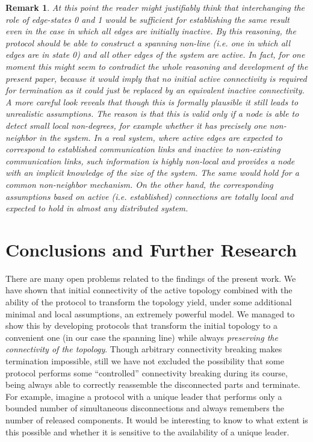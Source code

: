 \documentclass[preprint]{elsarticle}
\newtheorem{remark}{Remark}
\begin{document}
\begin{remark}
At this point the reader might justifiably think that interchanging the role of edge-states 0 and 1 would be sufficient for establishing the same result even in the case in which all edges are initially inactive. By this reasoning, the protocol should be able to construct a spanning \emph{non-line} (i.e. one in which all edges are in state 0) and all other edges of the system are active. In fact, for one moment this might seem to contradict the whole reasoning and development of the present paper, because it would imply that no initial active connectivity is required for termination as it could just be replaced by an equivalent inactive connectivity. A more careful look reveals that though this is formally plausible it still leads to unrealistic assumptions. The reason is that this is valid only if a node is able to detect small local \emph{non-degrees}, for example whether it has precisely one \emph{non-neighbor} in the system. In a real system, where active edges are expected to correspond to established communication links and inactive to non-existing communication links, such information is \emph{highly non-local} and provides a node with an \emph{implicit knowledge of the size of the system}. The same would hold for a common non-neighbor mechanism. On the other hand, the corresponding assumptions based on active (i.e. established) connections are totally local and expected to hold in almost any distributed system.
\end{remark}

\section{Conclusions and Further Research}
\label{sec:conclusions}

There are many open problems related to the findings of the present work. We have shown that initial connectivity of the active topology combined with the ability of the protocol to transform the topology yield, under some additional minimal and local assumptions, an extremely powerful model. We managed to show this by developing protocols that transform the initial topology to a convenient one (in our case the spanning line) while always \emph{preserving the connectivity of the topology}. Though arbitrary connectivity breaking makes termination impossible, still we have not excluded the possibility that some protocol performs some ``controlled'' connectivity breaking during its course, being always able to correctly reassemble the disconnected parts and terminate. For example, imagine a protocol with a unique leader that performs only a bounded number of simultaneous disconnections and always remembers the number of released components. It would be interesting to know to what extent is this possible and whether it is sensitive to the availability of a unique leader.
\end{document}
